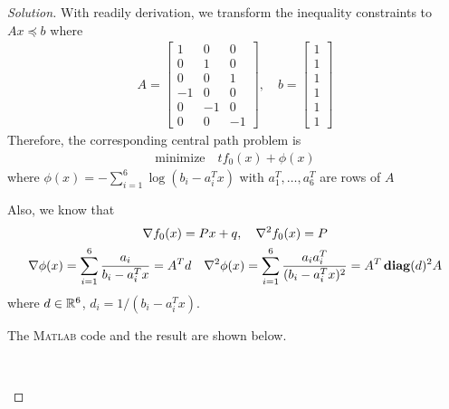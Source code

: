 \documentclass[12pt]{extarticle}
\theoremstyle{definition}
\begin{document}
\begin{proof}[Solution]
  \let\qed\relax
  With readily derivation, we transform the inequality constraints to $Ax\preceq b$ where
  \begin{align*}
    A=
    \begin{bmatrix}
      1&0&0\\0&1&0\\0&0&1\\-1&0&0\\0&-1&0\\0&0&-1
    \end{bmatrix},\quad
    b=
    \begin{bmatrix}
      1\\1\\1\\1\\1\\1
    \end{bmatrix}
  \end{align*}
  Therefore, the corresponding central path problem is
  \begin{align*}
    \text{minimize}\quad tf_0(x)+\phi(x)
  \end{align*}
  where $\phi(x)=-\sum_{i=1}^6\log(b_i-a_i^Tx)$ with $a_1^T,\dots,a_6^T$ are rows of $A$\par
  Also, we know that
  \begin{gather*}
    \nabla f_0(x)=Px+q,\quad\nabla^2f_0(x)=P\\
    \nabla\phi(x)=\sum_{i=1}^6\frac{a_i}{b_i-a_i^Tx}=A^Td\quad\nabla^2\phi(x)=\sum_{i=1}^6\frac{a_ia_i^T}{(b_i-a_i^Tx)^2}=A^T\mathop{\bf diag}(d)^2A
  \end{gather*}
  where $d\in\mathbb{R}^6$, $d_i=1/(b_i-a_i^Tx)$.\par
  The \textsc{Matlab} code and the result are shown below.
\begin{lstlisting}[style=Matlab-editor]
% file: hw7_2.m


\end{lstlisting}
\end{proof}
\end{document}
